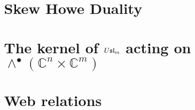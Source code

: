 \documentclass[11pt,leqno]{article}
\begin{document}
\section{Skew Howe Duality}

\section{The kernel of $U\mathfrak{sl}_{m}$ acting on $\wedge^\bullet(\mathbb C^{n} \times \mathbb C^m)$}

\section{Web relations}





\end{document}
